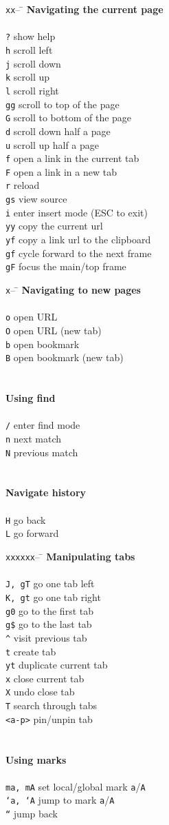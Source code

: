 \documentclass{article}
\newcommand{\narrowtabhead}{\texttt{x}-- \= \kill}
\newcommand{\tabhead}{\texttt{xx}-- \= \kill}
\newcommand{\widetabhead}{\texttt{xxxxxx}-- \= \kill}
\newcommand{\topic}[1]{\textbf{#1} \\ \\}
\newcommand{\cheat}[2]{\texttt{#1} \> #2 \\}
\begin{document}
  \thispagestyle{empty}
  
  \begin{multicols*}{4}
    \begin{tabbing}
      \tabhead
      \topic{Navigating the current page}
      \cheat{?}{show help}
      \cheat{h}{scroll left}
      \cheat{j}{scroll down}
      \cheat{k}{scroll up}
      \cheat{l}{scroll right}
      \cheat{gg}{scroll to top of the page}
      \cheat{G}{scroll to bottom of the page}
      \cheat{d}{scroll down half a page}
      \cheat{u}{scroll up half a page}
      \cheat{f}{open a link in the current tab}
      \cheat{F}{open a link in a new tab}
      \cheat{r}{reload}
      \cheat{gs}{view source}
      \cheat{i}{enter insert mode (ESC to exit)}
      \cheat{yy}{copy the current url}
      \cheat{yf}{copy a link url to the clipboard}
      \cheat{gf}{cycle forward to the next frame}
      \cheat{gF}{focus the main/top frame}
    \end{tabbing}
    
    \columnbreak
    
    \begin{tabbing}
      \narrowtabhead
      \topic{Navigating to new pages}
      \cheat{o}{open URL}
      \cheat{O}{open URL (new tab)}
      \cheat{b}{open bookmark}
      \cheat{B}{open bookmark (new tab)}
      \\
      \\
      \topic{Using find}
      \cheat{/}{enter find mode}
      \cheat{n}{next match}
      \cheat{N}{previous match}
      \\
      \\
      \topic{Navigate history}
      \cheat{H}{go back}
      \cheat{L}{go forward}
    \end{tabbing}
    
    \columnbreak
    
    \begin{tabbing}
      \widetabhead
      \topic{Manipulating tabs}
      \cheat{J, gT}{go one tab left}
      \cheat{K, gt}{go one tab right}
      \cheat{g0}{go to the first tab}
      \cheat{g\$}{go to the last tab}
      \cheat{\^}{visit previous tab}
      \cheat{t}{create tab}
      \cheat{yt}{duplicate current tab}
      \cheat{x}{close current tab}
      \cheat{X}{undo close tab}
      \cheat{T}{search through tabs}
      \cheat{<a-p>}{pin/unpin tab}
      \\
      \\
      \topic{Using marks}
      \cheat{ma, mA}{set local/global mark \texttt{a}/\texttt{A}}
      \cheat{`a, `A}{jump to mark \texttt{a}/\texttt{A}}
      \cheat{``}{jump back}
    \end{tabbing}
    

\end{multicols*}
\end{document}
